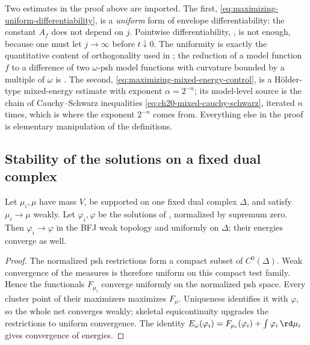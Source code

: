 \begin{remark}
\label{rem:ch28-stability-quoted}
Two estimates in the proof above are imported.  The first,
\eqref{eq:maximizing-uniform-differentiability}, is a \emph{uniform} form of
envelope differentiability: the constant \(A_f\) does not depend on \(j\).
Pointwise differentiability, ,
is not enough, because one must let \(j\to\infty\) before \(t\downarrow0\).
The uniformity is exactly the quantitative content of orthogonality used in
\cite{BJ25FiniteEnergy}; the reduction of a model function \(f\) to a
difference of two \(\omega\)-psh model functions with curvature bounded by a
multiple of \(\omega\) is .  The
second, \eqref{eq:maximizing-mixed-energy-control}, is a Hölder-type
mixed-energy estimate with exponent \(\alpha=2^{-n}\); its model-level source
is the chain of Cauchy--Schwarz inequalities
\eqref{eq:ch20-mixed-cauchy-schwarz}, iterated \(n\) times, which is where
the exponent \(2^{-n}\) comes from.  Everything else in the proof is
elementary manipulation of the definitions.
\end{remark}

\subsection{Stability of the solutions on a fixed dual complex}
\label{sec:ch28-fixed-skeleton}

\begin{proposition}
\label{prop:fixed-skeleton-stability}
Let \(\mu_i,\mu\) have mass \(V\), be supported on one fixed dual complex
\(\Delta\), and satisfy \(\mu_i\to\mu\) weakly.  Let \(\varphi_i,\varphi\)
be the solutions of , normalized by
supremum zero.  Then \(\varphi_i\to\varphi\) in the BFJ weak topology and
uniformly on \(\Delta\); their energies converge as well.
\end{proposition}

\begin{proof}
The normalized psh restrictions form a compact subset of \(C^0(\Delta)\).
Weak convergence of the measures is therefore uniform on this compact test
family.  Hence the functionals \(F_{\mu_i}\) converge uniformly on the
normalized psh space.  Every cluster point of their maximizers maximizes
\(F_\mu\).  Uniqueness identifies it with \(\varphi\), so the whole net
converges weakly; skeletal equicontinuity upgrades the restrictions to
uniform convergence.  The identity
\(E_\omega(\varphi_i)=F_{\mu_i}(\varphi_i)+
\int\varphi_i\,\rd \mu_i\) gives convergence of energies.
\end{proof}

